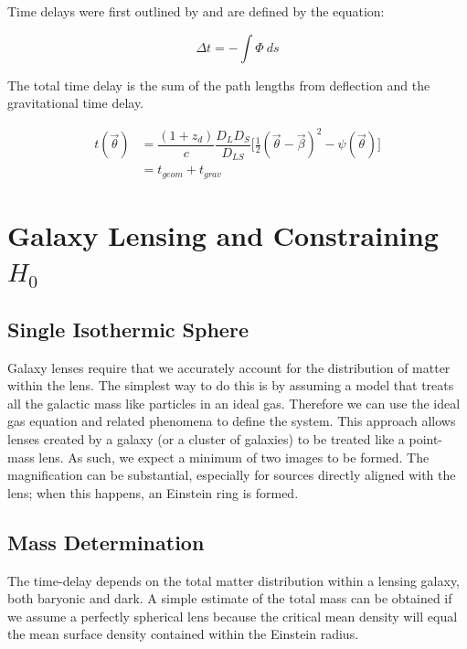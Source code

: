 \documentclass[12pt]{report}
\begin{document}
\newpage

Time delays were first outlined by \textcite{Shapiro1964} and are defined by the equation:
 
\begin{equation*}
    \Delta t = - \int \Phi \ ds
\end{equation*}

The total time delay is the sum of the path lengths from deflection and the gravitational time delay. 

\begin{equation*}
    \begin{split}
    t(\Vec{\theta}) &= \dfrac{(1 + z_{d})}{c} \dfrac{D_{L}D_{S}}{D_{LS}} \Bigg[ \frac{1}{2} (\Vec{\theta} - \Vec{\beta})^{2} - \psi(\Vec{\theta}) \Bigg] \\
    &= t_{geom} + t_{grav}
    \end{split}
\end{equation*}

\section{Galaxy Lensing and Constraining $H_{0}$}

\subsection{Single Isothermic Sphere}

Galaxy lenses require that we accurately account for the distribution of matter within the lens. The simplest way to do this is by assuming a model that treats all the galactic mass like particles in an ideal gas. Therefore we can use the ideal gas equation and related phenomena to define the system. This approach allows lenses created by a galaxy (or a cluster of galaxies) to be treated like a point-mass lens. As such, we expect a minimum of two images to be formed. The magnification can be substantial, especially for sources directly aligned with the lens; when this happens, an Einstein ring is formed. 

\subsection{Mass Determination}

The time-delay depends on the total matter distribution within a lensing galaxy, both baryonic and dark. A simple estimate of the total mass can be obtained if we assume a perfectly spherical lens because the critical mean density will equal the mean surface density contained within the Einstein radius. 
\end{document}
